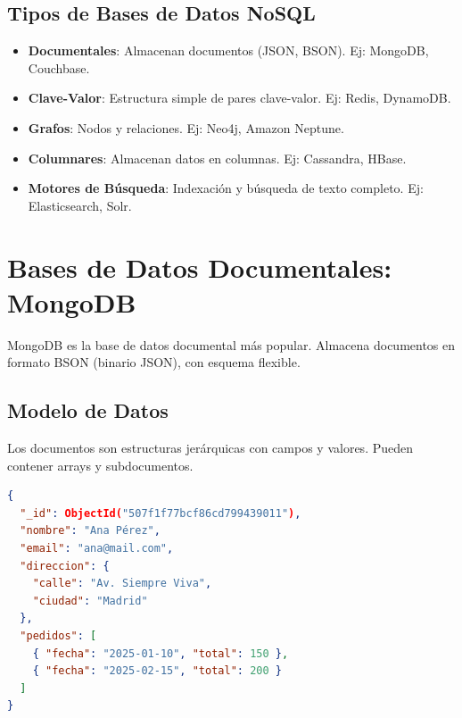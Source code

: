 \documentclass[12pt,a4paper,openany,oneside]{book}
\begin{document}
\begin{center}
\end{center}

\section{Tipos de Bases de Datos NoSQL}
\begin{itemize}
    \item \textbf{Documentales}: Almacenan documentos (JSON, BSON). Ej: MongoDB, Couchbase.
    \item \textbf{Clave-Valor}: Estructura simple de pares clave-valor. Ej: Redis, DynamoDB.
    \item \textbf{Grafos}: Nodos y relaciones. Ej: Neo4j, Amazon Neptune.
    \item \textbf{Columnares}: Almacenan datos en columnas. Ej: Cassandra, HBase.
    \item \textbf{Motores de Búsqueda}: Indexación y búsqueda de texto completo. Ej: Elasticsearch, Solr.
\end{itemize}

\chapter{Bases de Datos Documentales: MongoDB}
MongoDB es la base de datos documental más popular. Almacena documentos en formato BSON (binario JSON), con esquema flexible.

\section{Modelo de Datos}
Los documentos son estructuras jerárquicas con campos y valores. Pueden contener arrays y subdocumentos.
\begin{lstlisting}[language=JSON]
{
  "_id": ObjectId("507f1f77bcf86cd799439011"),
  "nombre": "Ana Pérez",
  "email": "ana@mail.com",
  "direccion": {
    "calle": "Av. Siempre Viva",
    "ciudad": "Madrid"
  },
  "pedidos": [
    { "fecha": "2025-01-10", "total": 150 },
    { "fecha": "2025-02-15", "total": 200 }
  ]
}
\end{lstlisting}
\end{document}
